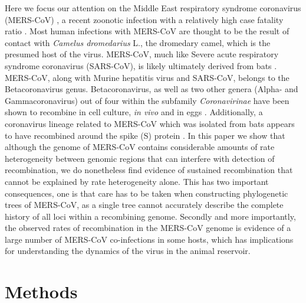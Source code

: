 \documentclass[11pt,oneside,letterpaper]{article}
\begin{document}
Here we focus our attention on the Middle East respiratory syndrome coronavirus (MERS-CoV) \citep{zaki_2012}, a recent zoonotic infection with a relatively high case fatality ratio \citep{cauchemez_2014,memish_2013,assiri_2013}.
Most human infections with MERS-CoV are thought to be the result of contact with \textit{Camelus dromedarius} L., the dromedary camel, which is the presumed host of the virus.
MERS-CoV, much like Severe acute respiratory syndrome coronavirus (SARS-CoV), is likely ultimately derived from bats \citep{corman_rooting_2014}.
MERS-CoV, along with Murine hepatitis virus and SARS-CoV, belongs to the Betacoronavirus genus.
Betacoronavirus, as well as two other genera (Alpha- and Gammacoronavirus) out of four within the subfamily \textit{Coronavirinae} have been shown to recombine in cell culture, \textit{in vivo} and in eggs \citep{lai_1985,makino_1986,keck_1988,kottier_1995,herrewegh_1998}.
Additionally, a coronavirus lineage related to MERS-CoV which was isolated from bats appears to have recombined around the spike (S) protein \citep{corman_rooting_2014}.
In this paper we show that although the genome of MERS-CoV contains considerable amounts of rate heterogeneity between genomic regions that can interfere with detection of recombination, we do nonetheless find evidence of sustained recombination that cannot be explained by rate heterogeneity alone.
This has two important consequences, one is that care has to be taken when constructing phylogenetic trees of MERS-CoV, as a single tree cannot accurately describe the complete history of all loci within a recombining genome.
Secondly and more importantly, the observed rates of recombination in the MERS-CoV genome is evidence of a large number of MERS-CoV co-infections in some hosts, which has implications for understanding the dynamics of the virus in the animal reservoir.

\section*{Methods}
\end{document}
